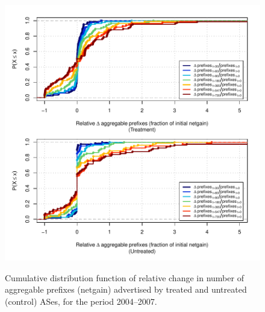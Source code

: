 \begin{figure}[H]
\begin{centering}
\begin{singlespace}
    \includegraphics[width=6in]{figures/behavior-rel_netgain-2004_2007-corr.pdf}
    \vspace{-2em}\\
    \caption{Cumulative distribution function of relative change in number of aggregable prefixes (netgain) advertised by treated and untreated (control) ASes, for the period 2004--2007.}
\end{singlespace}
\end{centering}
\end{figure}
